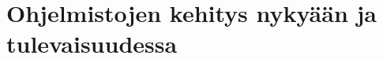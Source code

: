 \documentclass[finnish,12pt]{tktltiki2}
\theoremstyle{definition}
\theoremstyle{remark}
\begin{document}
\section{Ohjelmistojen kehitys nykyään ja tulevaisuudessa}

%
%
% 
%







% 
\end{document}
